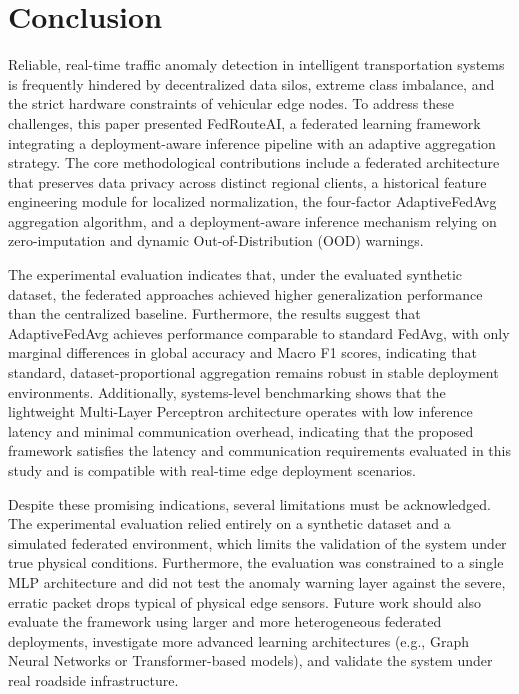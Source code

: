 \section{Conclusion}

Reliable, real-time traffic anomaly detection in intelligent transportation systems is frequently hindered by decentralized data silos, extreme class imbalance, and the strict hardware constraints of vehicular edge nodes. To address these challenges, this paper presented FedRouteAI, a federated learning framework integrating a deployment-aware inference pipeline with an adaptive aggregation strategy. The core methodological contributions include a federated architecture that preserves data privacy across distinct regional clients, a historical feature engineering module for localized normalization, the four-factor AdaptiveFedAvg aggregation algorithm, and a deployment-aware inference mechanism relying on zero-imputation and dynamic Out-of-Distribution (OOD) warnings.

The experimental evaluation indicates that, under the evaluated synthetic dataset, the federated approaches achieved higher generalization performance than the centralized baseline. Furthermore, the results suggest that AdaptiveFedAvg achieves performance comparable to standard FedAvg, with only marginal differences in global accuracy and Macro F1 scores, indicating that standard, dataset-proportional aggregation remains robust in stable deployment environments. Additionally, systems-level benchmarking shows that the lightweight Multi-Layer Perceptron architecture operates with low inference latency and minimal communication overhead, indicating that the proposed framework satisfies the latency and communication requirements evaluated in this study and is compatible with real-time edge deployment scenarios.

Despite these promising indications, several limitations must be acknowledged. The experimental evaluation relied entirely on a synthetic dataset and a simulated federated environment, which limits the validation of the system under true physical conditions. Furthermore, the evaluation was constrained to a single MLP architecture and did not test the anomaly warning layer against the severe, erratic packet drops typical of physical edge sensors. Future work should also evaluate the framework using larger and more heterogeneous federated deployments, investigate more advanced learning architectures (e.g., Graph Neural Networks or Transformer-based models), and validate the system under real roadside infrastructure.
